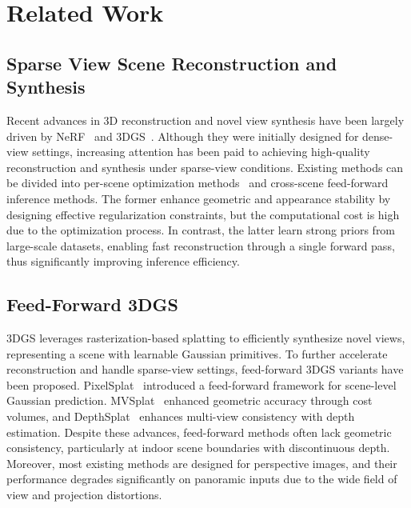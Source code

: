 \section{Related Work}\label{sec:related work}

\subsection{Sparse View Scene Reconstruction and Synthesis}\label{sec:2-1}

Recent advances in 3D reconstruction and novel view synthesis have been largely driven by NeRF~\cite{nerf} and 3DGS~\cite{3DGS}. Although they were initially designed for dense-view settings, increasing attention has been paid to achieving high-quality reconstruction and synthesis under sparse-view conditions. Existing methods can be divided into per-scene optimization methods~\cite{vcr,neusg,deng2023nerf,ye2024thermal} and cross-scene feed-forward inference methods. The former enhance geometric and appearance stability by designing effective regularization constraints, but the computational cost is high due to the optimization process. In contrast, the latter learn strong priors from large-scale datasets, enabling fast reconstruction through a single forward pass, thus significantly improving inference efficiency.

\subsection{Feed-Forward 3DGS}\label{sec:2-2}

3DGS leverages rasterization-based splatting to efficiently synthesize novel views, representing a scene with learnable Gaussian primitives.
To further accelerate reconstruction and handle sparse-view settings, feed-forward 3DGS variants have been proposed. PixelSplat~\cite{pixelsplat} introduced a feed-forward framework for scene-level Gaussian prediction.
MVSplat~\cite{mvsplat} enhanced geometric accuracy through cost volumes, and DepthSplat~\cite{depthsplat} enhances multi-view consistency with depth estimation.
Despite these advances, feed-forward methods often lack geometric consistency, particularly at indoor scene boundaries with discontinuous depth.
Moreover, most existing methods are designed for perspective images, and their performance degrades significantly on panoramic inputs due to the wide field of view and projection distortions.

